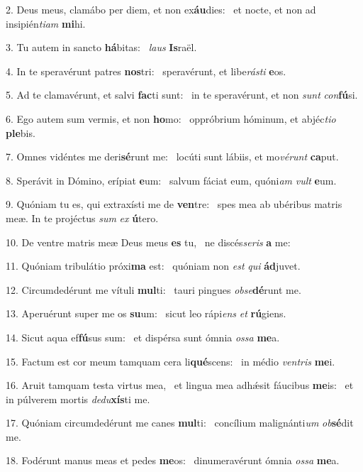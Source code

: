 2. Deus meus, clamábo per diem, et non ex\textbf{áu}dies: \ast\  et nocte, et non ad insipién\textit{ti}\textit{am} \textbf{mi}hi.\

3. Tu autem in sancto \textbf{há}bitas: \ast\  \textit{laus} \textbf{Is}raël.\

4. In te speravérunt patres \textbf{nos}tri: \ast\  speravérunt, et libe\textit{rás}\textit{ti} \textbf{e}os.\

5. Ad te clamavérunt, et salvi \textbf{fac}ti sunt: \ast\  in te speravérunt, et non \textit{sunt} \textit{con}\textbf{fú}si.\

6. Ego autem sum vermis, et non \textbf{ho}mo: \ast\  oppróbrium hóminum, et abjéc\textit{ti}\textit{o} \textbf{ple}bis.\

7. Omnes vidéntes me deri\textbf{sé}runt me: \ast\  locúti sunt lábiis, et mo\textit{vé}\textit{runt} \textbf{ca}put.\

8. Sperávit in Dómino, erípiat \textbf{e}um: \ast\  salvum fáciat eum, quóni\textit{am} \textit{vult} \textbf{e}um.\

9. Quóniam tu es, qui extraxísti me de \textbf{ven}tre: \ast\  spes mea ab ubéribus matris meæ. In te projéctus \textit{sum} \textit{ex} \textbf{ú}tero.\

10. De ventre matris meæ Deus meus \textbf{es} tu, \ast\  ne discés\textit{se}\textit{ris} \textbf{a} me:\

11. Quóniam tribulátio próxi\textbf{ma} est: \ast\  quóniam non \textit{est} \textit{qui} \textbf{ád}juvet.\

12. Circumdedérunt me vítuli \textbf{mul}ti: \ast\  tauri pingues \textit{ob}\textit{se}\textbf{dé}runt me.\

13. Aperuérunt super me os \textbf{su}um: \ast\  sicut leo rápi\textit{ens} \textit{et} \textbf{rú}giens.\

14. Sicut aqua ef\textbf{fú}sus sum: \ast\  et dispérsa sunt ómnia \textit{os}\textit{sa} \textbf{me}a.\

15. Factum est cor meum tamquam cera li\textbf{qué}scens: \ast\  in médio \textit{ven}\textit{tris} \textbf{me}i.\

16. Aruit tamquam testa virtus mea, \dag\  et lingua mea adhǽsit fáucibus \textbf{me}is: \ast\  et in púlverem mortis \textit{de}\textit{du}\textbf{xís}ti me.\

17. Quóniam circumdedérunt me canes \textbf{mul}ti: \ast\  concílium malignánti\textit{um} \textit{ob}\textbf{sé}dit me.\

18. Fodérunt manus meas et pedes \textbf{me}os: \ast\  dinumeravérunt ómnia \textit{os}\textit{sa} \textbf{me}a.\

